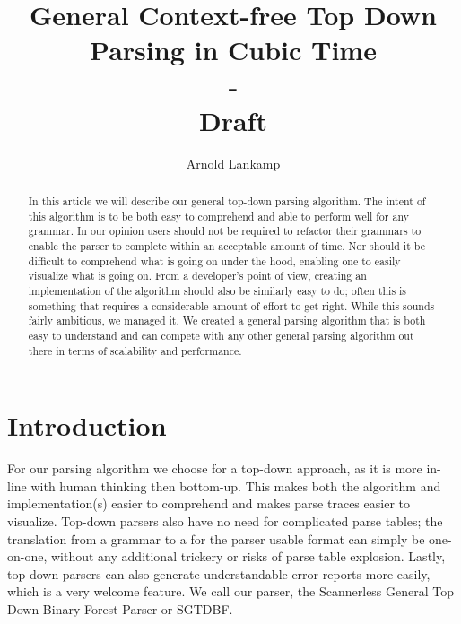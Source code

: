 \documentclass[a4paper,10pt]{article}
\title{General Context-free Top Down Parsing in Cubic Time\\-\\Draft}
\author{Arnold Lankamp}
\begin{document}
\maketitle

\pagebreak
\begin{abstract}

In this article we will describe our general top-down parsing algorithm. The intent of this algorithm is to be both easy to comprehend and able to perform well for any grammar. In our opinion users should not be required to refactor their grammars to enable the parser to complete within an acceptable amount of time. Nor should it be difficult to comprehend what is going on under the hood, enabling one to easily visualize what is going on. From a developer's point of view, creating an implementation of the algorithm should also be similarly easy to do; often this is something that requires a considerable amount of effort to get right. While this sounds fairly ambitious, we managed it. We created a general parsing algorithm that is both easy to understand and can compete with any other general parsing algorithm out there in terms of scalability and performance.

\end{abstract}

\section{Introduction}

For our parsing algorithm we choose for a top-down approach, as it is more in-line with human thinking then bottom-up. This makes both the algorithm and implementation(s) easier to comprehend and makes parse traces easier to visualize. Top-down parsers also have no need for complicated parse tables; the translation from a grammar to a for the parser usable format can simply be one-on-one, without any additional trickery or risks of parse table explosion. Lastly, top-down parsers can also generate understandable error reports more easily, which is a very welcome feature. We call our parser, the Scannerless General Top Down Binary Forest Parser or SGTDBF.
\end{document}
